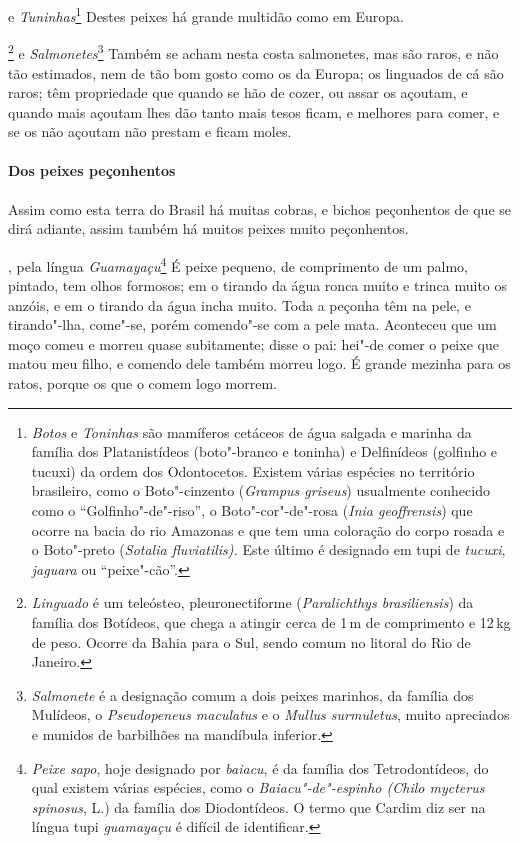  e \textit{Tuninhas}\footnote{ \textit{Botos} e 
\textit{Toninhas} são mamíferos cetáceos de água salgada e marinha da
família dos Platanistídeos (boto"-branco e toninha) e Delfinídeos
(golfinho e tucuxi) da ordem dos Odontocetos. Existem várias espécies
no território brasileiro, como o Boto"-cinzento (\textit{Grampus
griseus}) usualmente conhecido como o ``Golfinho"-de"-riso'', o
Boto"-cor"-de"-rosa (\textit{Inia geoffrensis}) que ocorre na bacia do
rio Amazonas e que tem uma coloração do corpo rosada e o Boto"-preto (\textit{Sotalia fluviatilis).} Este último é designado em tupi de
\textit{tucuxi}, \textit{jaguara} ou ``peixe"-cão''.} Destes
peixes há grande multidão como em Europa. 

\footnote{ \textit{Linguado} é um teleósteo,
pleuronectiforme (\textit{Paralichthys brasiliensis}) da família dos
Botídeos, que chega a atingir cerca de 1\,m de comprimento e
12\,kg de peso. Ocorre da Bahia para o Sul, sendo comum no
litoral do Rio de Janeiro.} e \textit{Salmonetes}\footnote{ \textit{Salmonete} 
é a designação comum a dois peixes marinhos, da
família dos Mulídeos, o \textit{Pseudopeneus maculatus} e o
\textit{Mullus surmuletus}, muito apreciados e munidos de barbilhões na
mandíbula inferior.} Também se acham nesta costa
salmonetes, mas são raros, e não tão estimados, nem de tão bom gosto
como os da Europa; os linguados de cá são raros; têm propriedade que
quando se hão de cozer, ou assar os açoutam, e quando mais açoutam lhes
dão tanto mais tesos ficam, e melhores para comer, e se os não açoutam
não prestam e ficam moles.

\paragraph{Dos peixes peçonhentos}

Assim como esta terra do Brasil há muitas cobras, e bichos
peçonhentos de que se dirá adiante, assim também há muitos peixes muito
peçonhentos.

, pela língua \textit{Guamayaçu}\footnote{ \textit{Peixe sapo}, 
hoje designado por \textit{baiacu}, é da família
dos Tetrodontídeos, do qual existem várias espécies, como o
\textit{Baiacu"-de"-espinho (Chilo mycterus spinosus}, L.) da família dos
Diodontídeos. O termo que Cardim diz ser na língua tupi
\textit{guamayaçu} é difícil de identificar.} É peixe
pequeno, de comprimento de um palmo, pintado, tem olhos formosos; em o
tirando da água ronca muito e trinca muito os anzóis, e em o tirando da
água incha muito. Toda a peçonha têm na pele, e tirando"-lha, come"-se,
porém comendo"-se com a pele mata. Aconteceu que um moço comeu e morreu
quase subitamente; disse o pai: hei"-de comer o peixe que matou meu
filho, e comendo dele também morreu logo. É grande mezinha para os
ratos, porque os que o comem logo morrem.

